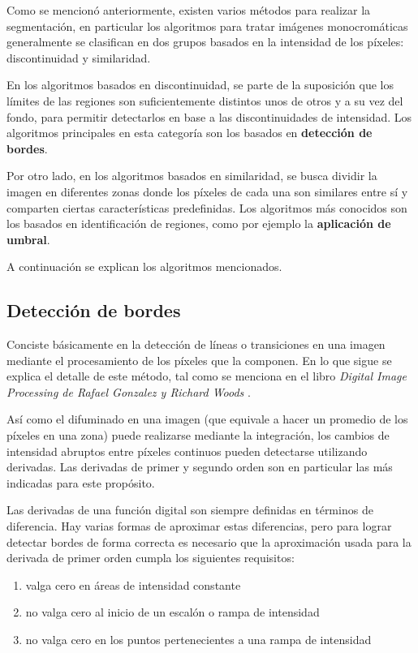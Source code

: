  Como se mencionó anteriormente, existen varios métodos para realizar la segmentación, en particular los algoritmos para tratar imágenes monocromáticas generalmente se clasifican en dos grupos basados en la intensidad de los píxeles: discontinuidad y similaridad. 

En los algoritmos basados en discontinuidad, se parte de la suposición que los límites de las regiones son suficientemente distintos unos de otros y a su vez del fondo, para permitir detectarlos en base a las discontinuidades de intensidad. Los algoritmos principales en esta categoría son los basados en \textbf{detección de bordes}.

Por otro lado, en los algoritmos basados en similaridad, se busca dividir la imagen en diferentes zonas donde los píxeles de cada una son similares entre sí y comparten ciertas características predefinidas. Los algoritmos más conocidos son los basados en identificación de regiones, como por ejemplo la \textbf{aplicación de umbral}.

A continuación se explican los algoritmos mencionados.

\subsection{Detección de bordes}
\label{detecbordeSec}

Conciste básicamente en la detección de líneas o transiciones en una imagen mediante el procesamiento de los píxeles que la componen. En lo que sigue se explica el detalle de este método, tal como se menciona en el libro \textit{Digital Image Processing de Rafael Gonzalez y Richard Woods} \cite{Gonzalez}.

Así como el difuminado en una imagen (que equivale a hacer un promedio de los píxeles en una zona) puede realizarse mediante la integración, los cambios de intensidad abruptos entre píxeles continuos pueden detectarse utilizando derivadas. Las derivadas de primer y segundo orden son en particular las más indicadas para este propósito.

Las derivadas de una función digital son siempre definidas en términos de diferencia. Hay varias formas de aproximar estas diferencias, pero para lograr detectar bordes de forma correcta es necesario que la aproximación usada para la derivada de primer orden cumpla los siguientes requisitos:

\begin{enumerate}
\item valga cero en áreas de intensidad constante
\item no valga cero al inicio de un escalón o rampa de intensidad
\item no valga cero en los puntos pertenecientes a una rampa de intensidad
\end{enumerate}

